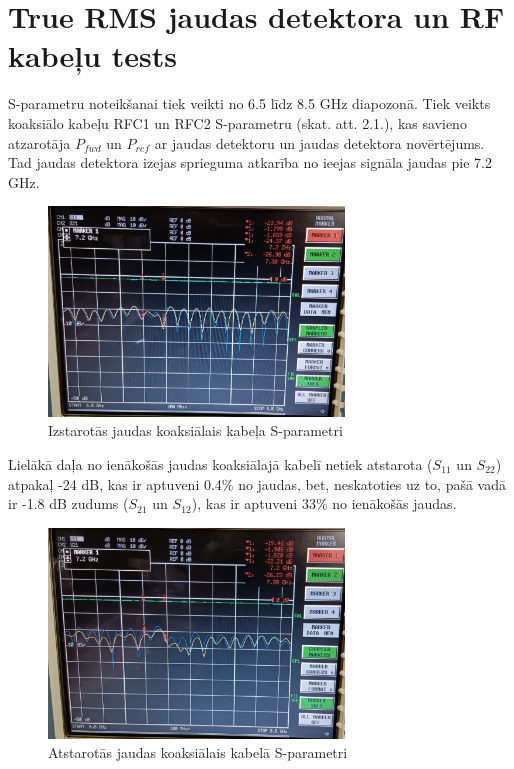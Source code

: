 \section{True RMS jaudas detektora un RF kabeļu tests}
S-parametru noteikšanai tiek veikti no 6.5 līdz 8.5 GHz diapozonā. Tiek veikts koaksiālo kabeļu RFC1 un RFC2 S-parametru (skat. att. 2.1.), kas savieno atzarotāja $P_{fwd}$ un $P_{ref}$ ar jaudas detektoru un jaudas detektora novērtējums. Tad jaudas detektora izejas sprieguma atkarība no ieejas signāla jaudas pie 7.2 GHz.
\begin{figure}[H]
	\centering
    \includegraphics[width=0.7\textwidth]{pictures/cable_coax_fwd.jpg}\hspace{1cm}
    \caption{Izstarotās jaudas koaksiālais kabeļa S-parametri}
\end{figure}
Lielākā daļa no ienākošās jaudas koaksiālajā kabelī netiek atstarota ($S_{11}$ un $S_{22}$) atpakaļ -24 dB, kas ir aptuveni 0.4\% no jaudas, bet, neskatoties uz to, pašā vadā ir -1.8 dB zudums ($S_{21}$ un $S_{12}$), kas ir aptuveni 33\% no ienākošās jaudas.
\begin{figure}[H]
	\centering
    \includegraphics[width=0.7\textwidth]{pictures/cable_coax_ref.jpg}\hspace{1cm}
    \caption{Atstarotās jaudas koaksiālais kabelā S-parametri}
\end{figure}
